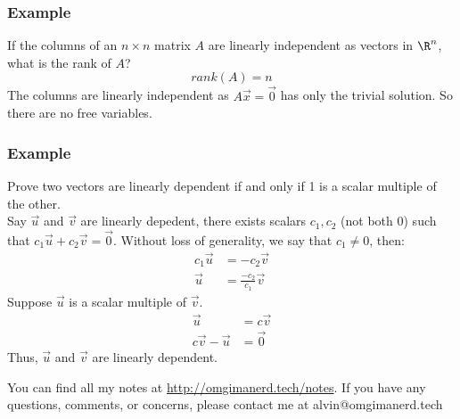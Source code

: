 \documentclass[letterpaper, 12pt]{math}
\begin{document}
\subsubsection*{Example}
If the columns of an \( n\times n \) matrix \( A \) are linearly independent
as vectors in \( \R^n \), what is the rank of \( A \)?
\[ rank(A) = n \]
The columns are linearly independent as \( A\vec{x} = \vec{0} \) has only the
trivial solution. So there are no free variables.

\subsubsection*{Example}
Prove two vectors are linearly dependent if and only if 1 is a scalar multiple
of the other. \\
Say \( \vec{u} \) and \( \vec{v} \) are linearly depedent, there exists scalars
\( c_1,c_2 \) (not both 0) such that \( c_1\vec{u}+c_2\vec{v} = \vec{0} \).
Without loss of generality, we say that \( c_1 \ne 0 \), then:
\begin{align*}
  c_1\vec{u} &= -c_2\vec{v} \\
  \vec{u} &= \frac{-c_2}{c_1}\vec{v}
\end{align*}
Suppose \( \vec{u} \) is a scalar multiple of \( \vec{v} \).
\begin{align*}
  \vec{u} &= c\vec{v} \\
  c\vec{v}-\vec{u} &= \vec{0}
\end{align*}
Thus, \( \vec{u} \) and \( \vec{v} \) are linearly dependent.

\begin{center}
  You can find all my notes at \url{http://omgimanerd.tech/notes}. If you have
  any questions, comments, or concerns, please contact me at
  alvin@omgimanerd.tech
\end{center}
\end{document}
